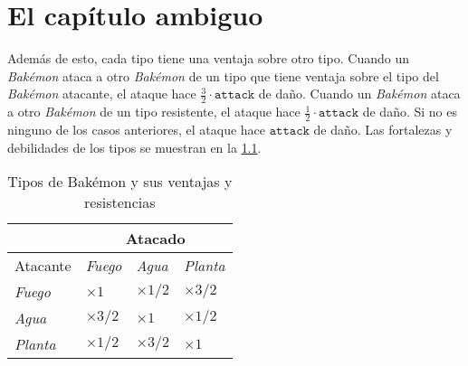 \chapter{El capítulo ambiguo}
\label{chap:ambiguo}
  
Además de esto, cada tipo tiene una ventaja sobre otro tipo.
Cuando un \textit{Bakémon} ataca a otro \textit{Bakémon} de un tipo que tiene ventaja
sobre el tipo del \textit{Bakémon} atacante, el ataque hace 
\(\frac{3}{2} \cdot \mathtt{attack}\) de daño.
Cuando un \textit{Bakémon} ataca a otro \textit{Bakémon} de un tipo resistente, el ataque
hace \(\frac{1}{2} \cdot \mathtt{attack}\) de daño.
Si no es ninguno de los casos anteriores, el ataque hace \(\mathtt{attack}\) de daño.
Las fortalezas y debilidades de los tipos se muestran en la \cref{tab:tipos}.

\begin{table}[ht!]
  \centering
  \begin{tabular}{ |p{2cm}|p{2cm}|p{2cm}|p{2cm}|  }
    \hline
              & \multicolumn{3}{|c|}{Atacado} \\
    \hline
    Atacante  & \textit{Fuego}              & \textit{Agua}           & \textit{Planta} \\
    \hline
    \textit{Fuego}  & \(\times 1\)           & \(\times 1/2\)         & \(\times 3/2\) \\
    \hline
    \textit{Agua}   & \(\times 3/2\)         & \(\times 1\)           & \(\times 1/2\) \\
    \hline
    \textit{Planta} & \(\times 1/2\)         & \(\times 3/2\)         & \(\times 1\) \\
    \hline
    \end{tabular}
  \caption{Tipos de Bakémon y sus ventajas y resistencias}
  \label{tab:tipos}
\end{table}
  \printbibliography[keyword=ambiguo]